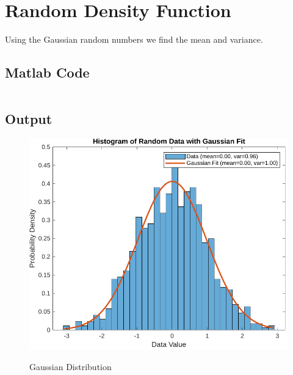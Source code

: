 \section{Random Density Function}
\label{sec:random density function}

Using the Gaussian random numbers we find the mean and variance. 

\subsection{Matlab Code}

\inputminted[fontsize=\footnotesize,autogobble]{matlab}{code/density.m}
\subsection{Output}

\begin{figure}[!htb]
	\centering
	\includegraphics[width=6in]{res/figures/Figure_2.pdf}
	\label{output:gaussian distribution}
	\caption{Gaussian Distribution}
\end{figure}